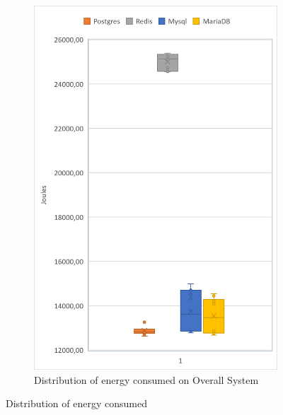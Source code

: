 \begin{figure}[h]
\begin{subfigure}[b]{0.33\textwidth}
			\includegraphics[width=1\columnwidth]{results/boxplot/10m/Total.png}
            \caption[Distribution of energy consumed on Overall System]%
            {{\small Distribution of energy consumed on Overall System}}    
            \label{fig:bocplotyenergytotal10m}
        \end{subfigure}
        \caption[ Distribution of energy consumed ]
        {\small Distribution of energy consumed} 
        \label{fig:bocplotyenergy10m}
    \end{figure}



